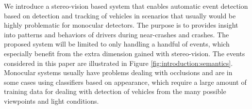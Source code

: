 
%
We introduce a stereo-vision based system that enables automatic event detection based on detection and tracking of vehicles in scenarios that usually would be highly problematic for monocular detectors. The purpose is to provides insight into patterns and behaviors of drivers during near-crashes and crashes. The proposed system will be limited to only handling a handful of events, which especially benefit from the extra dimension gained with stereo-vision. The events considered in this paper are illustrated in Figure \ref{fig:introduction:semantics}.
Monocular systems usually have problems dealing with occlusions and are in some cases using classifiers based on appearance, which require a large amount of training data for dealing with detection of vehicles from the many possible viewpoints and light conditions. 
\vspace*{-3mm}
